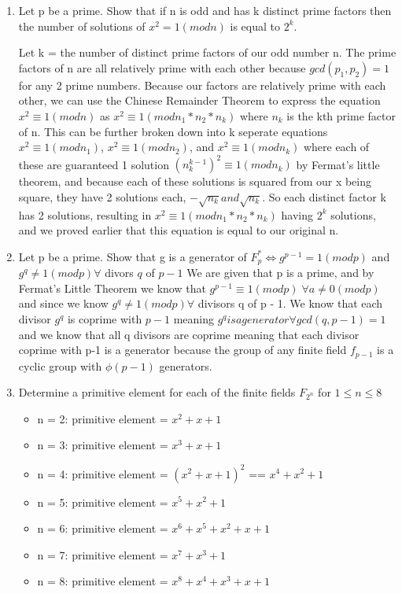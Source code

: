 \documentclass[12pt]{article}
\begin{document}
\begin{enumerate}
  \item Let p be a prime.  Show that if n is odd and has k distinct prime factors then the number of solutions of $x^2 = 1 (mod n)$ is equal to $2^k$.
    \par
    Let k = the number of distinct prime factors of our odd number n.  The prime factors of n are all relatively prime with each other because $ gcd(p_1, p_2) = 1 $ for any 2 prime numbers.  Because our factors are relatively prime with each other, we can use the Chinese Remainder Theorem to express the equation $ x^2 \equiv 1 (mod n) $ as $ x^2 \equiv 1 (mod n_1 * n_2 * n_k) $ where $ n_k $ is the kth prime factor of n.  This can be further broken down into k seperate equations $ x^2 \equiv 1 (mod n_1) $, $ x^2 \equiv 1 (mod n_2) $, and $ x^2 \equiv 1 (mod n_k) $ where each of these are guaranteed 1 solution $(n_{k}^{k - 1})^2 \equiv 1 (mod n_k) $ by Fermat's little theorem, and because each of these solutions is squared from our x being square, they have 2 solutions each, $ - \sqrt{n_k} and \sqrt{n_k} $.  So each distinct factor k has 2 solutions, resulting in $ x^2 \equiv 1 (mod n_1 * n_2 * n_k) $ having $2^k$ solutions, and we proved earlier that this equation is equal to our original n.


  \item Let p be a prime.  Show that g is a generator of $ F^*_p \iff g^{p-1} = 1 (mod p)$ and $ g^q \ne 1 (mod p) \forall $ divors $ q $ of $p-1$
    We are given that p is a prime, and by Fermat's Little Theorem we know that $g^{p-1} \equiv 1 (modp ) \; \forall a \neq 0 (mod p)$ and since we know $g^q \ne 1( mod p) \forall $ divisors q of p - 1.  We know that each divisor $g^{q}$ is coprime with $p-1$ meaning $g^q is a generator \forall gcd(q, p-1) = 1$ and we know that all q divisors are coprime meaning that each divisor coprime with p-1 is a generator because the group of any finite field $f_{p-1}$ is a cyclic group with $\phi(p-1)$ generators. 

  \item Determine a primitive element for each of the finite fields $F_{2^n}$ for $1 \le n \le 8$
    \begin{itemize}
      \item n = 2: primitive element = $x^2 + x + 1$ 
      \item n = 3: primitive element = $x^3 + x + 1$
      \item n = 4: primitive element = $(x^2 + x + 1)^2$ == $x^4 + x^2 +  1$
      \item n = 5: primitive element = $x^5 + x^2 + 1$
      \item n = 6: primitive element = $x^6 + x^5 + x^2 + x + 1$
      \item n = 7: primitive element = $x^7 + x^3 + 1$
      \item n = 8: primitive element = $x^8 + x^4 + x^3 + x + 1$
    \end{itemize} 




\end{enumerate}
\end{document}
